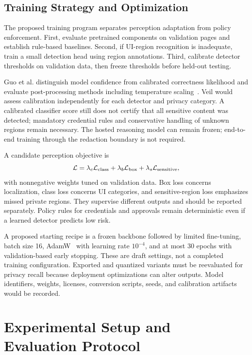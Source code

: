 \documentclass[conference]{IEEEtran}
\begin{document}
\subsection{Training Strategy and Optimization}
The proposed training program separates perception adaptation from policy enforcement. First, evaluate pretrained components on validation pages and establish rule-based baselines. Second, if UI-region recognition is inadequate, train a small detection head using region annotations. Third, calibrate detector thresholds on validation data, then freeze thresholds before held-out testing.

Guo et al. distinguish model confidence from calibrated correctness likelihood and evaluate post-processing methods including temperature scaling~\cite{calibration}. Veil would assess calibration independently for each detector and privacy category. A calibrated classifier score still does not certify that all sensitive content was detected; mandatory credential rules and conservative handling of unknown regions remain necessary. The hosted reasoning model can remain frozen; end-to-end training through the redaction boundary is not required.

A candidate perception objective is
\begin{equation}
 \mathcal{L}=\lambda_c\mathcal{L}_{\rm class}
 +\lambda_b\mathcal{L}_{\rm box}+\lambda_s\mathcal{L}_{\rm sensitive},
\end{equation}
with nonnegative weights tuned on validation data. Box loss concerns localization, class loss concerns UI categories, and sensitive-region loss emphasizes missed private regions. They supervise different outputs and should be reported separately. Policy rules for credentials and approvals remain deterministic even if a learned detector predicts low risk.

A proposed starting recipe is a frozen backbone followed by limited fine-tuning, batch size 16, AdamW~\cite{adamw} with learning rate $10^{-4}$, and at most 30 epochs with validation-based early stopping. These are draft settings, not a completed training configuration. Exported and quantized variants must be reevaluated for privacy recall because deployment optimizations can alter outputs. Model identifiers, weights, licenses, conversion scripts, seeds, and calibration artifacts would be recorded.



\section{Experimental Setup and Evaluation Protocol}
\end{document}
